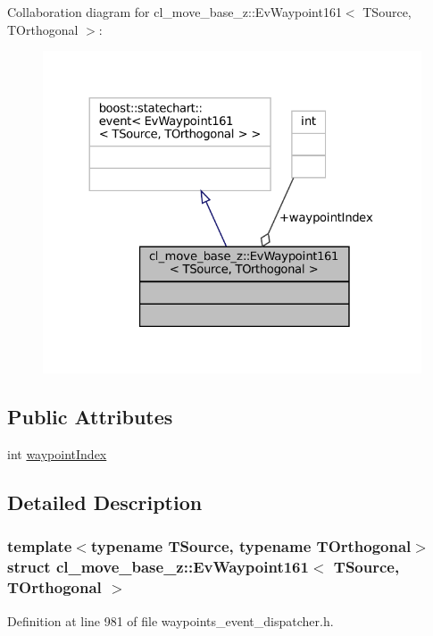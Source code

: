 Collaboration diagram for cl\+\_\+move\+\_\+base\+\_\+z\+:\+:Ev\+Waypoint161$<$ T\+Source, T\+Orthogonal $>$\+:
\nopagebreak
\begin{figure}[H]
\begin{center}
\leavevmode
\includegraphics[width=324pt]{structcl__move__base__z_1_1EvWaypoint161__coll__graph}
\end{center}
\end{figure}
\subsection*{Public Attributes}
\begin{DoxyCompactItemize}
\item 
int \hyperlink{structcl__move__base__z_1_1EvWaypoint161_a4c76cde6c6660e744b5ca7e58da1b0cb}{waypoint\+Index}
\end{DoxyCompactItemize}


\subsection{Detailed Description}
\subsubsection*{template$<$typename T\+Source, typename T\+Orthogonal$>$\newline
struct cl\+\_\+move\+\_\+base\+\_\+z\+::\+Ev\+Waypoint161$<$ T\+Source, T\+Orthogonal $>$}



Definition at line 981 of file waypoints\+\_\+event\+\_\+dispatcher.\+h.



